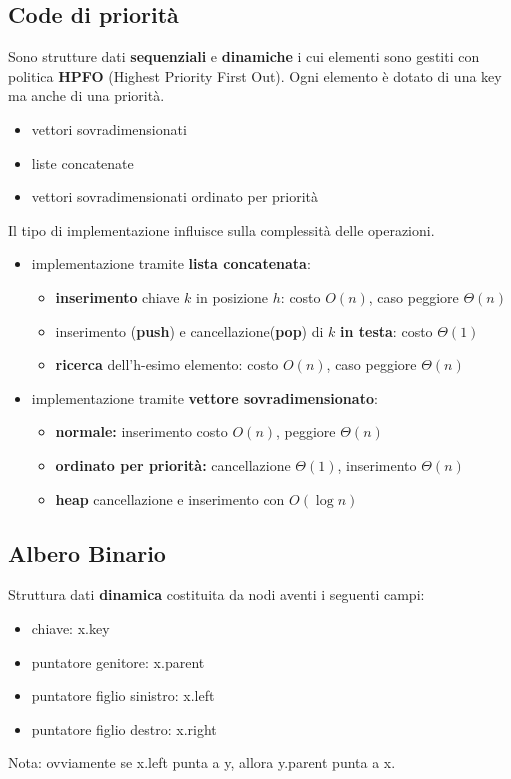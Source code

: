 \documentclass{article}
\begin{document}
\subsection{Code di priorità} %
Sono strutture dati \textbf{sequenziali} e \textbf{dinamiche} i cui elementi sono gestiti con politica \textbf{HPFO} (Highest Priority First Out).
 Ogni elemento è dotato di una key ma anche di una priorità.
\begin{itemize}
    \item vettori sovradimensionati
    \item liste concatenate
    \item vettori sovradimensionati ordinato per priorità
\end{itemize}
Il tipo di implementazione influisce sulla complessità delle operazioni.
\begin{itemize}

\item implementazione tramite \textbf{lista concatenata}: 
\begin{itemize}
    \item \textbf{inserimento} chiave $k$ in posizione $h$: costo $O(n)$, caso peggiore $\Theta(n)$
    \item inserimento (\textbf{push}) e cancellazione(\textbf{pop}) di $k$ \textbf{in testa}: costo $\Theta(1)$ 
    \item \textbf{ricerca} dell'h-esimo elemento: costo $O(n)$, caso peggiore $\Theta(n)$
\end{itemize}
\item implementazione tramite \textbf{vettore sovradimensionato}:
\begin{itemize}
    \item \textbf{normale:} inserimento costo $O(n)$, peggiore $\Theta(n)$
    \item \textbf{ordinato per priorità:} cancellazione $\Theta(1)$, inserimento $\Theta(n)$
    \item \textbf{heap} cancellazione e inserimento con $O(\log n)$
\end{itemize}
\end{itemize}
\subsection{Albero Binario} %
Struttura dati \textbf{dinamica} costituita da nodi aventi i seguenti campi:
\begin{itemize}
    \item chiave: x.key
    \item puntatore genitore: x.parent
    \item puntatore figlio sinistro: x.left
    \item puntatore figlio destro: x.right
\end{itemize}
Nota: ovviamente se x.left punta a y, allora y.parent punta a x. 
\end{document}
